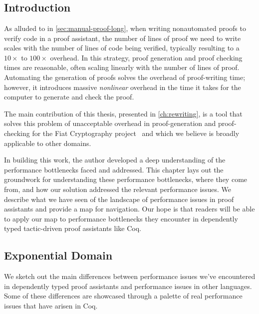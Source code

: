 \chapter{} \label{ch:perf-failures}

\section{Introduction}\label{sec:perf-failures:story}

As alluded to in \autoref{sec:manual-proof-long}, when writing nonautomated proofs to verify code in a proof assistant, the number of lines of proof we need to write scales with the number of lines of code being verified, typically resulting to a $10\times$ to $100\times$ overhead.
In this strategy, proof generation and proof checking times are reasonable, often scaling linearly with the number of lines of proof.
Automating the generation of proofs solves the overhead of proof-writing time; however, it introduces massive \emph{nonlinear} overhead in the time it takes for the computer to generate and check the proof.

The main contribution of this thesis, presented in \autoref{ch:rewriting}, is a tool that solves this problem of unacceptable overhead in proof-generation and proof-checking for the Fiat Cryptography project~\cite{FiatCryptoSP19} and which we believe is broadly applicable to other domains.

In building this work, the author developed a deep understanding of the performance bottlenecks faced and addressed.
This chapter lays out the groundwork for understanding these performance bottlenecks, where they come from, and how our solution addressed the relevant performance issues.
We describe what we have seen of the landscape of performance issues in proof assistants and provide a map for navigation.
Our hope is that readers will be able to apply our map to performance bottlenecks they encounter in dependently typed tactic-driven proof assistants like Coq.

\section{Exponential Domain}\label{sec:perf-failures:exponential-domain}\label{sec:fiat-crypto-codegen-numbers}

We sketch out the main differences between performance issues we've encountered in dependently typed proof assistants and performance issues in other languages.
Some of these differences are showcased through a palette of real performance issues that have arisen in Coq.

